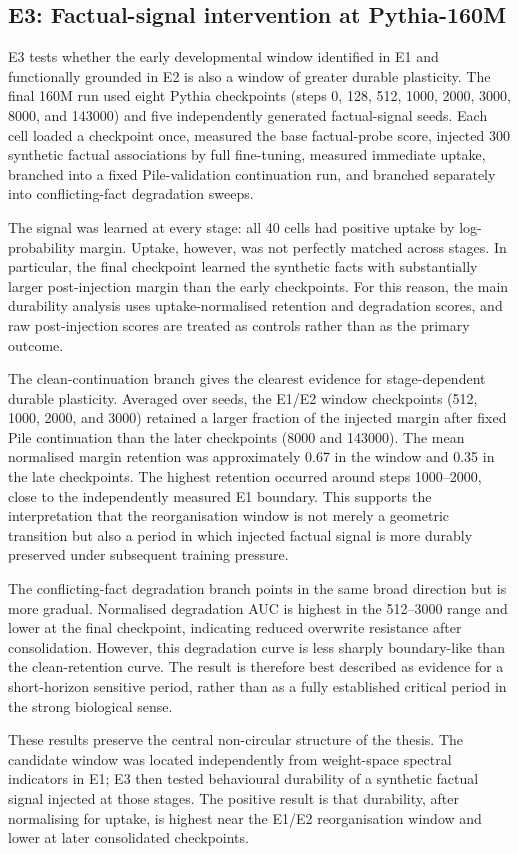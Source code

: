 
\subsection{E3: Factual-signal intervention at Pythia-160M}
\label{sec:e3-factual-160m}

E3 tests whether the early developmental window identified in E1 and functionally grounded in E2 is also a window of greater durable plasticity. The final 160M run used eight Pythia checkpoints (steps 0, 128, 512, 1000, 2000, 3000, 8000, and 143000) and five independently generated factual-signal seeds. Each cell loaded a checkpoint once, measured the base factual-probe score, injected 300 synthetic factual associations by full fine-tuning, measured immediate uptake, branched into a fixed Pile-validation continuation run, and branched separately into conflicting-fact degradation sweeps.

The signal was learned at every stage: all 40 cells had positive uptake by log-probability margin. Uptake, however, was not perfectly matched across stages. In particular, the final checkpoint learned the synthetic facts with substantially larger post-injection margin than the early checkpoints. For this reason, the main durability analysis uses uptake-normalised retention and degradation scores, and raw post-injection scores are treated as controls rather than as the primary outcome.

The clean-continuation branch gives the clearest evidence for stage-dependent durable plasticity. Averaged over seeds, the E1/E2 window checkpoints (512, 1000, 2000, and 3000) retained a larger fraction of the injected margin after fixed Pile continuation than the later checkpoints (8000 and 143000). The mean normalised margin retention was approximately 0.67 in the window and 0.35 in the late checkpoints. The highest retention occurred around steps 1000--2000, close to the independently measured E1 boundary. This supports the interpretation that the reorganisation window is not merely a geometric transition but also a period in which injected factual signal is more durably preserved under subsequent training pressure.

The conflicting-fact degradation branch points in the same broad direction but is more gradual. Normalised degradation AUC is highest in the 512--3000 range and lower at the final checkpoint, indicating reduced overwrite resistance after consolidation. However, this degradation curve is less sharply boundary-like than the clean-retention curve. The result is therefore best described as evidence for a short-horizon sensitive period, rather than as a fully established critical period in the strong biological sense.

These results preserve the central non-circular structure of the thesis. The candidate window was located independently from weight-space spectral indicators in E1; E3 then tested behavioural durability of a synthetic factual signal injected at those stages. The positive result is that durability, after normalising for uptake, is highest near the E1/E2 reorganisation window and lower at later consolidated checkpoints.
